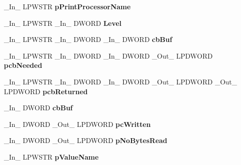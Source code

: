 \begin{DoxyCompactItemize}
\+\_\+\+In\+\_\+ L\+P\+W\+S\+TR {\bfseries p\+Print\+Processor\+Name}
\item 
\mbox{\label{struct___p_r_i_n_t_p_r_o_v_i_d_o_r_a0510118ce79964a4c35bab2c506841b7}} 
\+\_\+\+In\+\_\+ L\+P\+W\+S\+TR \+\_\+\+In\+\_\+ D\+W\+O\+RD {\bfseries Level}
\item 
\mbox{\label{struct___p_r_i_n_t_p_r_o_v_i_d_o_r_a81c4c20183b8cd031a207495ade1dc6c}} 
\+\_\+\+In\+\_\+ L\+P\+W\+S\+TR \+\_\+\+In\+\_\+ D\+W\+O\+RD \+\_\+\+In\+\_\+ D\+W\+O\+RD {\bfseries cb\+Buf}
\item 
\mbox{\label{struct___p_r_i_n_t_p_r_o_v_i_d_o_r_a8df8c515209cec8381e1373738f3495d}} 
\+\_\+\+In\+\_\+ L\+P\+W\+S\+TR \+\_\+\+In\+\_\+ D\+W\+O\+RD \+\_\+\+In\+\_\+ D\+W\+O\+RD \+\_\+\+Out\+\_\+ L\+P\+D\+W\+O\+RD {\bfseries pcb\+Needed}
\item 
\mbox{\label{struct___p_r_i_n_t_p_r_o_v_i_d_o_r_a06bcfad259de0c867fffe22eff301d28}} 
\+\_\+\+In\+\_\+ L\+P\+W\+S\+TR \+\_\+\+In\+\_\+ D\+W\+O\+RD \+\_\+\+In\+\_\+ D\+W\+O\+RD \+\_\+\+Out\+\_\+ L\+P\+D\+W\+O\+RD \+\_\+\+Out\+\_\+ L\+P\+D\+W\+O\+RD {\bfseries pcb\+Returned}
\item 
\mbox{\label{struct___p_r_i_n_t_p_r_o_v_i_d_o_r_a26695f8406e3fe6648c550ce036b3d7c}} 
\+\_\+\+In\+\_\+ D\+W\+O\+RD {\bfseries cb\+Buf}
\item 
\mbox{\label{struct___p_r_i_n_t_p_r_o_v_i_d_o_r_a8c20af37d11013ab1cf9b4e901c63363}} 
\+\_\+\+In\+\_\+ D\+W\+O\+RD \+\_\+\+Out\+\_\+ L\+P\+D\+W\+O\+RD {\bfseries pc\+Written}
\item 
\mbox{\label{struct___p_r_i_n_t_p_r_o_v_i_d_o_r_ac9eaf06fde9fe1038d7bf315ac799b3d}} 
\+\_\+\+In\+\_\+ D\+W\+O\+RD \+\_\+\+Out\+\_\+ L\+P\+D\+W\+O\+RD {\bfseries p\+No\+Bytes\+Read}
\item 
\mbox{\label{struct___p_r_i_n_t_p_r_o_v_i_d_o_r_ae1ae532a4d14d0b9cc8f4f00e6896a6a}} 
\+\_\+\+In\+\_\+ L\+P\+W\+S\+TR {\bfseries p\+Value\+Name}

\end{DoxyCompactItemize}
